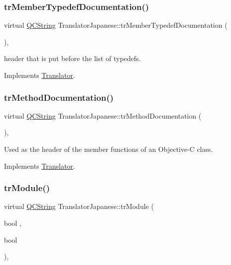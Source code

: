 \subsubsection{\texorpdfstring{trMemberTypedefDocumentation()}{trMemberTypedefDocumentation()}}
{\footnotesize\ttfamily virtual \mbox{\hyperlink{class_q_c_string}{Q\+C\+String}} Translator\+Japanese\+::tr\+Member\+Typedef\+Documentation (\begin{DoxyParamCaption}{ }\end{DoxyParamCaption})\hspace{0.3cm}{\ttfamily [inline]}, {\ttfamily [virtual]}}

header that is put before the list of typedefs. 

Implements \mbox{\hyperlink{class_translator}{Translator}}.

\mbox{\label{class_translator_japanese_aedb0e792f5d6b3b9a50794f1982263ff}} 
\subsubsection{\texorpdfstring{trMethodDocumentation()}{trMethodDocumentation()}}
{\footnotesize\ttfamily virtual \mbox{\hyperlink{class_q_c_string}{Q\+C\+String}} Translator\+Japanese\+::tr\+Method\+Documentation (\begin{DoxyParamCaption}{ }\end{DoxyParamCaption})\hspace{0.3cm}{\ttfamily [inline]}, {\ttfamily [virtual]}}

Used as the header of the member functions of an Objective-\/C class. 

Implements \mbox{\hyperlink{class_translator}{Translator}}.

\mbox{\label{class_translator_japanese_a357fb0ca2586478cf1f0d1ce81fa78a1}} 
\subsubsection{\texorpdfstring{trModule()}{trModule()}}
{\footnotesize\ttfamily virtual \mbox{\hyperlink{class_q_c_string}{Q\+C\+String}} Translator\+Japanese\+::tr\+Module (\begin{DoxyParamCaption}\item[{bool}]{,  }\item[{bool}]{ }\end{DoxyParamCaption})\hspace{0.3cm}{\ttfamily [inline]}, {\ttfamily [virtual]}}

